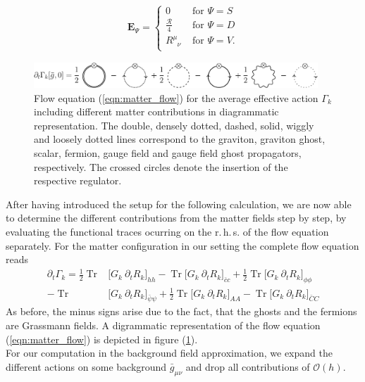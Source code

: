 \begin{align}
	\mathbf{E}_{\Psi} =  \left\{\begin{array}{ll}{0} & {\text { for } \Psi = S} \\[5pt] {\frac{\mathcal{R}}{4}} & {\text { for } \Psi = D}\\[5pt]  {R^{\mu}_{\phantom{\mu}\nu}} & {\text { for } \Psi = V.}\end{array}\right.
\end{align}
\begin{figure}[t]
	\centering
	\includegraphics[width=0.95\textwidth]{figs/TikZ/matter_corrections}
\caption[Flow equation for the average effective action $\Gamma_k$ including different matter contributions in diagrammatic representation.]{Flow equation (\ref{eqn:matter_flow}) for the average effective action $\Gamma_k$ including different matter contributions in diagrammatic representation. The double, densely dotted, dashed, solid, wiggly and loosely dotted lines correspond to the graviton, graviton ghost, scalar, fermion, gauge field  and gauge field ghost propagators, respectively. The crossed circles denote the insertion of the respective regulator.}
	\label{fig:matter_calc}
	\hrulefill
\end{figure}
After having introduced the setup for the following calculation, we are now able to determine the different contributions from the matter fields step by step, by evaluating the functional traces ocurring on the r.\,h.\,s. of the flow equation separately. For the matter configuration in our setting the complete flow equation reads
\begin{equation}
\begin{aligned}
 \partial_t\Gamma_{k} =\frac{1}{2} \operatorname{Tr}&\bigl[G_k\ \partial_t R_{k}\bigr]_{h h} - \operatorname{Tr}\bigl[G_k\ \partial_t R_{k}\bigr]_{\bar{c}c} + \frac{1}{2}\operatorname{Tr}\bigl[G_k\ \partial_t R_{k}\bigr]_{\phi\phi}\\[10pt] -\operatorname{Tr}&\bigl[G_k\ \partial_t R_{k}\bigr]_{\bar{\psi} \psi} 
 +\frac{1}{2}\operatorname{Tr}\bigl[G_k\ \partial_t R_{k}\bigr]_{AA} -\operatorname{Tr}\bigl[G_k\ \partial_t R_{k}\bigr]_{\bar{C}C}\end{aligned}
\label{eqn:matter_flow}
\end{equation}
As before, the minus signs arise due to the fact, that the ghosts and the fermions are Grassmann fields. A digrammatic representation of the flow equation (\ref{eqn:matter_flow}) is depicted in figure (\ref{fig:matter_calc}). \\
For our computation in the background field approximation, we expand the different actions on some background $\bar{g}_{\mu\nu}$ and drop all contributions of $\mathcal{O}(h)$.
\vfill
